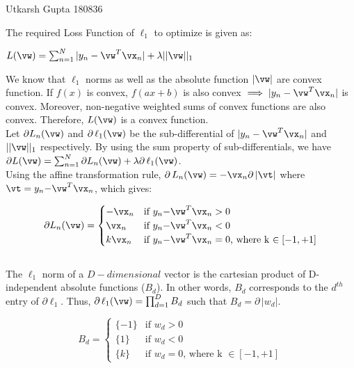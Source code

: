\documentclass[a4paper,12pt]{article}
\begin{document}
{Utkarsh Gupta}   %
{180836}	%

\begin{mlsolution}

The required Loss Function of $\ell_1$ to optimize is given as:

\begin{center}
$L(\vw) = \sum_{n=1}^N|y_n-\vw^T\vx_n|+\lambda||\vw||_1$
\end{center}

We know that $\ell_1$ norms as well as the absolute function $|\vw|$ are convex function. If $f(x)$ is convex, $f(ax+b)$ is also convex $\implies |y_n-\vw^T\vx_n|$ is convex. Moreover, non-negative weighted sums of convex functions are also convex. Therefore, $L(\vw)$ is a convex function. \\

Let $\partial L_n(\vw)$ and $\partial\,\ell_1(\vw)$ be the sub-differential of $|y_n-\vw^T\vx_n|$ and $||\vw||_1$ respectively. By using the sum property of sub-differentials, we have $\partial L(\vw) = \sum_{n=1}^N\partial L_n(\vw) + \lambda\partial\,\ell_1(\vw)$. \\

Using the affine transformation rule, $\partial\,L_n(\vw) = {-}\vx_n\partial\,|\vt|$ where $\vt=y_n{-}\vw^T\vx_n$, which gives:

\[
  \partial L_n(\vw) =
  \begin{cases}
  -\vx_n & \text{if $y_n{-}\vw^T\vx_n>0$} \\
  \vx_n & \text{if $y_n{-}\vw^T\vx_n<0$} \\
  k\vx_n & \text{if $y_n{-}\vw^T\vx_n=0$, where k $\in [-1, +1]$}
  \end{cases}
\]\\

The $\ell_1$ norm of a $D-dimensional$ vector is the cartesian product of D-independent absolute functions ($B_d$). In other words, $B_d$ corresponds to the $d^{th}$ entry of $\partial\ell_1$. Thus, $\partial\,\ell_1(\vw) = \prod_{d=1}^{D}B_d$ such that $B_d = 
\partial\,|w_d|$.

\[
  B_d =
  \begin{cases}
  \{-1\} & \text{if $w_d>0$} \\
  \{1\} & \text{if $w_d<0$} \\
  \{k\} & \text{if $w_d=0$, where k $\in [-1, +1]$}
  \end{cases}
\]\\


\end{mlsolution}
\end{document}
